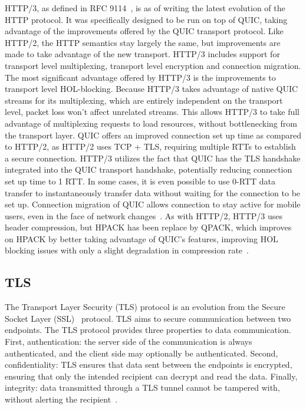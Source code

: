 \documentclass[english, 12pt, a4paper, elec, utf8, a-2b, online]{aaltothesis}
\begin{document}
HTTP/3, as defined in RFC 9114~\cite{rfc9114}, is as of writing the latest evolution
of the HTTP protocol. It was specifically designed to be run on top of QUIC,
taking advantage of the improvements offered by the QUIC transport protocol. Like HTTP/2,
the HTTP semantics stay largely the same, but improvements are made to take advantage
of the new transport. HTTP/3 includes support for transport level multiplexing,
transport level encryption and connection migration. The most significant advantage
offered by HTTP/3 is the improvements to transport level HOL-blocking. Because HTTP/3
takes advantage of native QUIC streams for its multiplexing, which are entirely independent
on the transport level, packet loss won't affect unrelated streams. This allows
HTTP/3 to take full advantage of multiplexing requests to load resources, without
bottlenecking from the transport layer. QUIC offers an improved connection set up
time as compared to HTTP/2, as HTTP/2 uses TCP + TLS, requiring multiple RTTs to
establish a secure connection. HTTP/3 utilizes the fact that QUIC has the TLS
handshake integrated into the QUIC transport handshake, potentially reducing
connection set up time to 1 RTT. In some cases, it is even possible to use 0-RTT
data transfer to instantaneously transfer data without waiting for the connection
to be set up. Connection migration of QUIC allows connection to stay active for mobile
users, even in the face of network changes~\cite{rfc9114}. As with HTTP/2, HTTP/3 uses header compression,
but HPACK has been replace by QPACK, which improves on HPACK by better taking advantage
of QUIC's features, improving HOL blocking issues with only a slight degradation
in compression rate~\cite{rfc9204}.


\subsection{TLS}
\label{sec:tls}
The Transport Layer  Security (TLS) protocol is an evolution from the Secure Socket Layer (SSL)~\cite{rfc6101} protocol.
TLS aims to secure communication between two endpoints. The TLS protocol provides three
properties to data communication. First, authentication: the server side of the
communication is always authenticated, and the client side may optionally be
authenticated. Second, confidentiality: TLS ensures that data sent between the
endpoints is encrypted, ensuring that only the intended recipient can
decrypt and read the data. Finally, integrity: data transmitted through
a TLS tunnel cannot be tampered with, without alerting the recipient~\cite{rfc8446}.
\end{document}
